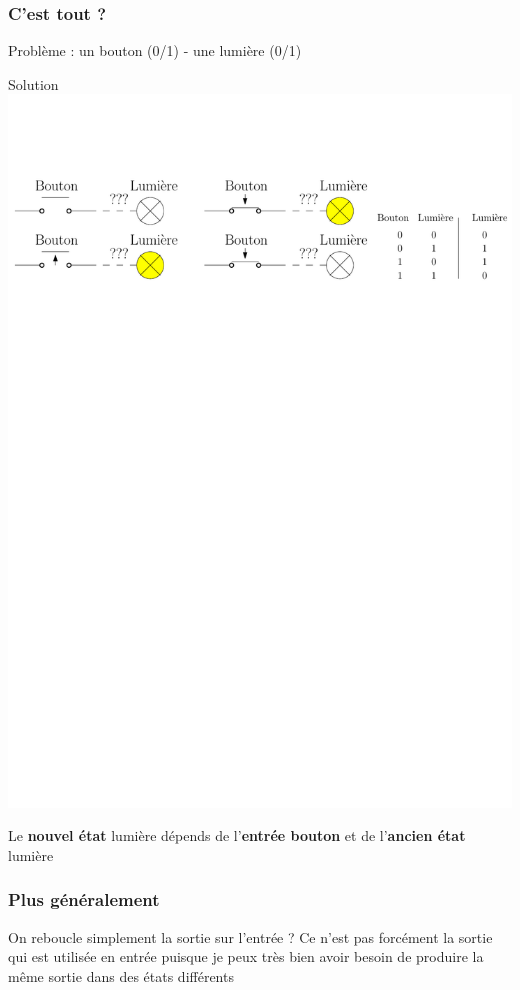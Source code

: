 \documentclass{beamer}
\begin{document}
\begin{frame}
\frametitle{C'est tout ?}
Problème : un bouton (0/1) - une lumière (0/1)
\begin{block}{Solution}
\centering\includegraphics[width=\linewidth]{Figs/bouton_lumiere.pdf}
\end{block}
Le \textbf{nouvel état} lumière dépends de l'\textbf{entrée bouton} et de l'\textbf{ancien état} lumière
\end{frame}

\begin{frame}
\frametitle{Plus généralement}
\begin{block}{On reboucle simplement la sortie sur l'entrée ?}
Ce n'est pas forcément la sortie qui est utilisée en entrée puisque je peux très bien avoir besoin de produire la même sortie dans des états différents
\end{block}
\end{frame}
\end{document}
